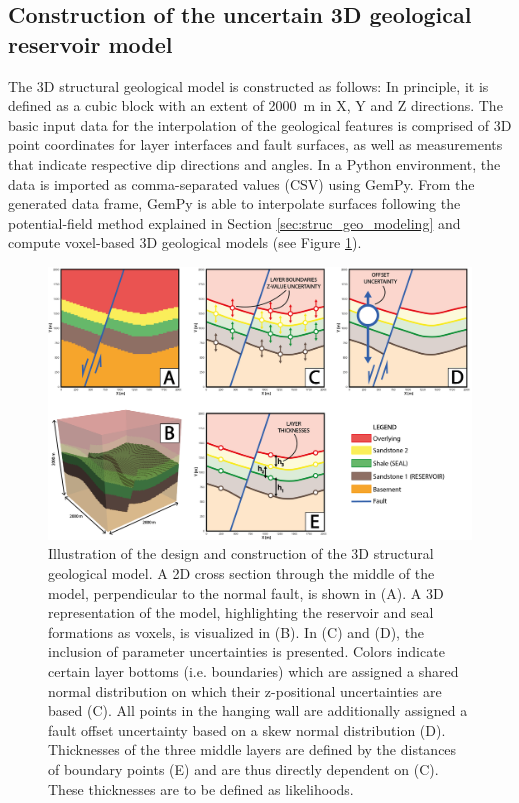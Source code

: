 		\subsection{Construction of the uncertain 3D geological reservoir model}\label{sec:3D_construction}
		The 3D structural geological model is constructed as follows: In principle, it is defined as a cubic block with an extent of 2000~m in X, Y and Z directions. The basic input data for the interpolation of the geological features is comprised of 3D point coordinates for layer interfaces and fault surfaces, as well as measurements that indicate respective dip directions and angles. In a Python environment, the data is imported as comma-separated values (CSV) using GemPy. From the generated data frame, GemPy is able to interpolate surfaces following the potential-field method explained in Section \ref{sec:struc_geo_modeling} and compute voxel-based 3D geological models (see Figure \ref{fig:3Dmodel_construction}).
		\begin{figure}[h]
			\centering
			\includegraphics[width=1\textwidth]{Figures/Uncertainties_Likelihoods.png}
			\caption{Illustration of the design and construction of the 3D structural geological model. A 2D cross section through the middle of the model, perpendicular to the normal fault, is shown in (A). A 3D representation of the model, highlighting the reservoir and seal formations as voxels, is visualized in (B). In (C) and (D), the inclusion of parameter uncertainties is presented. Colors indicate certain layer bottoms (i.e. boundaries) which are assigned a shared normal distribution on which their z-positional uncertainties are based (C). All points in the hanging wall are additionally assigned a fault offset uncertainty based on a skew normal distribution (D). Thicknesses of the three middle layers are defined by the distances of boundary points (E) and are thus directly dependent on (C). These thicknesses are to be defined as likelihoods.}\label{fig:3Dmodel_construction}
		\end{figure}
